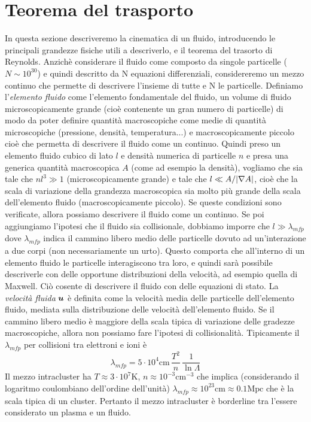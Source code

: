 \section{Teorema del trasporto} \label{sec:teoremadeltrasporto}
In questa sezione descriveremo la cinematica di un fluido, introducendo le principali grandezze fisiche utili a descriverlo, e il teorema del trasorto di Reynolds. Anzichè considerare il fluido come composto da singole particelle ($N\sim 10^{30}$) e quindi descritto da N equazioni differenziali, considereremo un mezzo continuo che permette di descrivere l'insieme di tutte e N le particelle. Definiamo l'\textit{elemento fluido} come l'elemento fondamentale del fluido, un volume di fluido microscopicamente grande (cioè contenente un gran numero di particelle) di modo da poter definire quantità macroscopiche come medie di quantità microscopiche (pressione, densità, temperatura...) e macroscopicamente piccolo cioè che permetta di descrivere il fluido come un continuo. Quindi preso un elemento fluido cubico di lato $l$ e densità numerica di particelle $n$ e presa una generica quantità macroscopica $A$ (come ad esempio la densità), vogliamo che sia tale che $nl^3\gg 1$ (microscopicamente grande) e tale che $l\ll A/|\V{\nabla} A|$, cioè che la scala di variazione della grandezza macroscopica sia molto più grande della scala dell'elemento fluido (macroscopicamente piccolo). Se queste condizioni sono verificate, allora possiamo descrivere il fluido come un continuo. Se poi aggiungiamo l'ipotesi che il fluido sia collisionale, dobbiamo imporre che $l\gg \lambda_{mfp}$ dove $\lambda_{mfp}$ indica il cammino libero medio delle particelle dovuto ad un'interazione a due corpi (non necessariamente un urto). Questo comporta che all'interno di un elemento fluido le particelle interagiscono tra loro, e quindi sarà possibile descriverle con delle opportune distribuzioni della velocità, ad esempio quella di Maxwell. Ciò cosente di descrivere il fluido con delle equazioni di stato. La \textit{velocità fluida} $\V{u}$ è definita come la velocità media delle particelle dell'elemento fluido, mediata sulla distribuzione delle velocità dell'elemento fluido. Se il cammino libero medio è maggiore della scala tipica di variazione delle gradezze macroscopiche, allora non possiamo fare l'ipotesi di collisionalità. Tipicamente il $\lambda_{mfp}$ per collisioni tra elettroni e ioni è 
\begin{equation}
\lambda_{mfp}=5\cdot 10^4 \mathrm{cm}\, \frac{T^2}{n}\,\frac{1}{\ln \Lambda}
\end{equation}
Il mezzo intracluster ha $T\approx 3\cdot10^7 \mathrm{K}$, $n\approx 10^{-3} \mathrm{cm}^{-3}$ che implica (considerando il logaritmo coulombiano dell'ordine dell'unità) $\lambda_{mfp} \approx 10^{23} \mathrm{cm} \approx 0.1 \mathrm{Mpc}$ che è la scala tipica di un cluster. Pertanto il mezzo intracluster è borderline tra l'essere considerato un plasma e un fluido.

